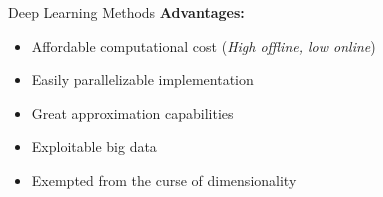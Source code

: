 \begin{frame}{Deep Learning Methods}
\textbf{Advantages:}
\vspace{0.4cm}
\begin{itemize}
\item Affordable computational cost (\textit{High offline, low online})
\vspace{0.4cm}
\item Easily parallelizable implementation
\vspace{0.4cm}
\item Great approximation capabilities
\vspace{0.4cm}
\item Exploitable big data
\vspace{0.4cm}
\item Exempted from the curse of dimensionality
\end{itemize}
\end{frame}
